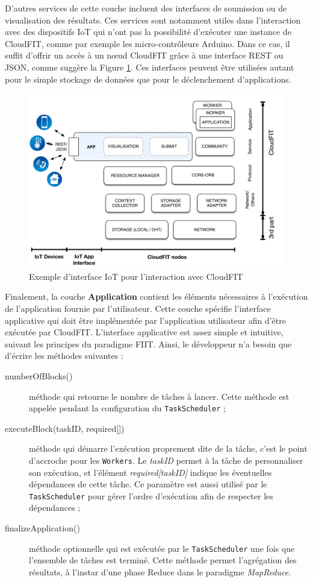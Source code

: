  D'autres services de cette couche incluent des interfaces de soumission ou de visualisation des résultats. Ces services sont notamment utiles dans l'interaction avec des dispositifs IoT qui n'ont pas la possibilité d'exécuter une instance de CloudFIT, comme par exemple les micro-contrôleurs Arduino. Dans ce cas, il suffit d'offrir un accès à un n{\oe}ud CloudFIT grâce à une interface REST ou JSON, comme suggère la Figure \ref{fig:cloudFitStackIoT}. Ces interfaces peuvent être utilisées autant pour le simple stockage de données que pour le déclenchement d'applications.

\begin{figure}
	\centering
		\includegraphics[width=0.65\linewidth]{img/CloudFITstack-IoT}
		\caption{Exemple d'interface IoT pour l'interaction avec CloudFIT}\label{fig:cloudFitStackIoT}
\end{figure}


Finalement, la couche \textbf{Application} contient les éléments nécessaires à l'exécution de l'application fournie par l'utilisateur. Cette couche spécifie l'interface applicative qui doit être implémentée par l'application utilisateur afin d'être exécutée par CloudFIT. L'interface applicative est assez simple et intuitive, suivant les principes du paradigme FIIT. Ainsi, le développeur n'a besoin que d'écrire les méthodes suivantes :
\begin{description}
	\item [numberOfBlocks()] méthode qui retourne le nombre de tâches à lancer. Cette méthode est appelée pendant la configuration du \texttt{TaskScheduler} ;
	\item [executeBlock(taskID, required{[]}) ] méthode qui démarre l'exécution proprement dite de la tâche, c'est le point d'accroche pour les \texttt{Workers}. Le \textit{taskID} permet à la tâche de personnaliser son exécution, et l'élément \textit{required[taskID]} indique les éventuelles dépendances de cette tâche. Ce paramètre est aussi utilisé par le \texttt{TaskScheduler} pour gérer l'ordre d'exécution afin de respecter les dépendances ;
	\item [finalizeApplication()] méthode optionnelle qui est exécutée par le \texttt{TaskScheduler} une fois que l'ensemble de tâches est terminé. Cette méthode permet l'agrégation des résultats, à l'instar d'une phase Reduce dans le paradigme \textit{MapReduce}.
\end{description}

